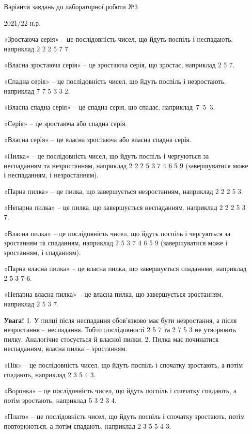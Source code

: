 \documentclass[11pt, ukrainian]{article}
\begin{document}
{\Large \center  Варіанти завдань до лабораторної роботи №3\par 2021/22 н.р.\par \bigskip\bigskip}

«Зростаюча серія» – це послідовність чисел, що йдуть поспіль і неспадають, наприклад 2 2 2 5 7 7.

«Власна зростаюча серія» – це зростаюча серія, що зростає, наприклад 2  5  7.

«Спадна серія» – це послідовність чисел, що йдуть поспіль і незростають, наприклад 7 7 5 3 3 2.

«Власна спадна серія» – це спадна серія, що спадає, наприклад~7~5~3.

«Серія» – це зростаюча або спадна серія.

«Власна серія» – це власна зростаюча або власна спадна серія.

«Пилка» – це послідовність чисел, що йдуть поспіль і чергуються за неспаданням та незростанням, наприклад 2 2 2 5 3 7 4 6 5 9 (завершуватися може і неспаданням, і незростанням).

«Парна пилка» – це пилка, що завершується незростанням, наприклад 2 2 2 5 3.

«Непарна пилка» – це пилка, що завершується неспаданням, наприклад 2 2 2 5 3 7.

«Власна пилка» – це послідовність чисел, що йдуть поспіль і чергуються за зростанням та спаданням, наприклад 2 5 3 7 4 6 5 9 (завершуватися може і зростанням, і спаданням).

«Парна власна пилка» – це власна пилка, що завершується спаданням, наприклад 2 5 3 7 6.

«Непарна власна пилка» – це власна пилка, що завершується зростанням, наприклад 2 5 3 7.

\textbf{Увага!} 1. У пилці після неспадання обов’язково має бути незростання, а після незростання  – неспадання. Тобто послідовності 2 5 7 та 2 7 5 3 не утворюють пилку. Аналогічне стосується й власної пилки. 2. Пилка має починатися неспаданням, власна пилка – зростанням.

«Пік» – це послідовність чисел, що йдуть поспіль і спочатку зростають, а потім спадають, наприклад 2 3 5 4 3. 

«Воронка» – це послідовність чисел, що йдуть поспіль і спочатку спадають, а потім зростають, наприклад 5 3 2 3 4.

«Плато» – це послідовність чисел, що йдуть поспіль і спочатку зростають, потім повторюються, а потім спадають, наприклад 2 3 5 5 4 3.
\end{document}
